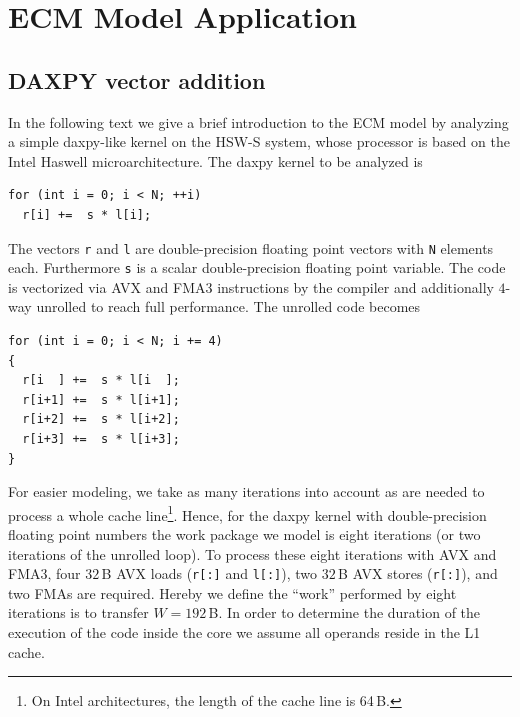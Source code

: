 \section{ECM Model Application}
\label{sec:ecm-application}

\subsection{DAXPY vector addition}
\label{sec:epm}


In the following text we give a brief introduction to the ECM model by analyzing a
simple daxpy-like kernel on the HSW-S system, whose processor is based on the Intel Haswell
microarchitecture. The daxpy kernel to be analyzed is
%
\begin{lstlisting}
for (int i = 0; i < N; ++i) 
  r[i] +=  s * l[i];
\end{lstlisting}
%
The vectors \verb'r' and \verb'l' are double-precision floating point vectors
with \verb'N' elements each. 
Furthermore \verb's' is a scalar double-precision floating point variable.
%
The code is vectorized via AVX and FMA3 instructions by the compiler and
additionally $4$-way unrolled to reach full performance.
The unrolled code becomes
\begin{lstlisting}
for (int i = 0; i < N; i += 4)
{
  r[i  ] +=  s * l[i  ];
  r[i+1] +=  s * l[i+1];
  r[i+2] +=  s * l[i+2];
  r[i+3] +=  s * l[i+3];
}
\end{lstlisting}
%
For easier modeling, we take as many iterations into account as are needed to
process a whole cache line\footnote{On Intel architectures, the length of the cache line is 64\,B.}.
Hence, for the daxpy kernel with double-precision floating point numbers the
work package we model is eight iterations (or two iterations of the unrolled loop).
%
To process these eight iterations with AVX and FMA3, four $32$\,B AVX loads (\verb|r[:]| and
\verb|l[:]|), two
$32$\,B AVX stores (\verb'r[:]'), and two FMAs are required.
%
Hereby we define the ``work'' performed by eight iterations is to transfer $W = 192$\,B.
%
In order to determine the duration of the execution of the code inside
the core we assume all operands reside in the L1 cache.

